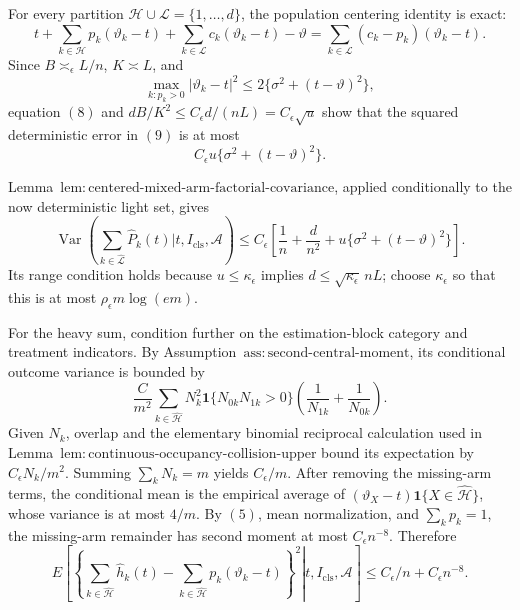For every partition \(\mathcal H\cup\mathcal L=\{1,\ldots,d\}\), the population centering identity is exact:
\[
 t+\sum_{k\in\mathcal H}p_k(\vartheta_k-t)
 +\sum_{k\in\mathcal L}c_k(\vartheta_k-t)-\vartheta
 =\sum_{k\in\mathcal L}(c_k-p_k)(\vartheta_k-t).
\tag{9}
\]
Since \(B\asymp_{\epsilon}L/n\), \(K\asymp L\), and
\[
 \max_{k:p_k>0}|\vartheta_k-t|^2
 \le2\{\sigma^2+(t-\vartheta)^2\},
\tag{10}
\]
equation \((8)\) and \(dB/K^2\le C_{\epsilon}d/(nL)=C_{\epsilon}\sqrt u\) show that the squared deterministic error in \((9)\) is at most
\[
 C_{\epsilon}u\{\sigma^2+(t-\vartheta)^2\}.
\tag{11}
\]

Lemma~\(\mathrm{lem:centered\text{-}mixed\text{-}arm\text{-}factorial\text{-}covariance}\), applied conditionally to the now deterministic light set, gives
\[
 \operatorname{Var}\!\left(
 \sum_{k\in\widehat{\mathcal L}}\widehat P_k(t)
 \mathrel{\Big|}t,I_{\mathrm{cls}},\mathcal A\right)
 \le C_{\epsilon}\left[
 \frac1n+\frac d{n^2}
 +u\{\sigma^2+(t-\vartheta)^2\}
 \right].
\tag{12}
\]
Its range condition holds because \(u\le\kappa_{\epsilon}\) implies \(d\le\sqrt{\kappa_{\epsilon}}\,nL\); choose \(\kappa_{\epsilon}\) so that this is at most \(\rho_{\epsilon}m\log(em)\).

For the heavy sum, condition further on the estimation-block category and treatment indicators.  By Assumption~\(\mathrm{ass:second\text{-}central\text{-}moment}\), its conditional outcome variance is bounded by
\[
 \frac{C}{m^2}\sum_{k\in\widehat{\mathcal H}}
 N_k^2\mathbf 1\{N_{0k}N_{1k}>0\}
 \left(\frac1{N_{1k}}+\frac1{N_{0k}}\right).
\]
Given \(N_k\), overlap and the elementary binomial reciprocal calculation used in Lemma~\(\mathrm{lem:continuous\text{-}occupancy\text{-}collision\text{-}upper}\) bound its expectation by \(C_{\epsilon}N_k/m^2\).  Summing \(\sum_kN_k=m\) yields \(C_{\epsilon}/m\).  After removing the missing-arm terms, the conditional mean is the empirical average of \((\vartheta_X-t)\mathbf 1\{X\in\widehat{\mathcal H}\}\), whose variance is at most \(4/m\).  By \((5)\), mean normalization, and \(\sum_kp_k=1\), the missing-arm remainder has second moment at most \(C_{\epsilon}n^{-8}\).  Therefore
\[
 E\!\left[\left.
 \left\{
 \sum_{k\in\widehat{\mathcal H}}\widehat h_k(t)
 -\sum_{k\in\widehat{\mathcal H}}p_k(\vartheta_k-t)
 \right\}^2\right|t,I_{\mathrm{cls}},\mathcal A\right]
 \le C_{\epsilon}/n+C_{\epsilon}n^{-8}.
\tag{13}
\]

